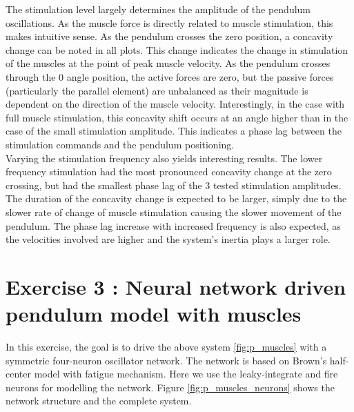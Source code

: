 \documentclass{cmc}
\begin{document}
The stimulation level largely determines the amplitude of the pendulum oscillations. As the muscle force is directly related to muscle stimulation, this makes intuitive sense. As the pendulum crosses the zero position, a concavity change can be noted in all plots. This change indicates the change in stimulation of the muscles at the point of peak muscle velocity. As the pendulum crosses through the 0 angle position, the active forces are zero, but the passive forces (particularly the parallel element) are unbalanced as their magnitude is dependent on the direction of the muscle velocity. Interestingly, in the case with full muscle stimulation, this concavity shift occurs at an angle higher than in the case of the small stimulation amplitude. This indicates a phase lag between the stimulation commands and the pendulum positioning.\\

Varying the stimulation frequency also yields interesting results. The lower frequency stimulation had the most pronounced concavity change at the zero crossing, but had the smallest phase lag of the 3 tested stimulation amplitudes. The duration of the concavity change is expected to be larger, simply due to the slower rate of change of muscle stimulation causing the slower movement of the pendulum. The phase lag increase with increased frequency is also expected, as the velocities involved are higher and the system's inertia plays a larger role. 

\newpage
\section*{Exercise 3 : Neural network driven pendulum model with
  muscles}
\label{sec:neur-netw-driv}

In this exercise, the goal is to drive the above system
\ref{fig:p_muscles} with a symmetric four-neuron oscillator
network. The network is based on Brown's half-center model with
fatigue mechanism. Here we use the leaky-integrate and fire neurons
for modelling the network. Figure \ref{fig:p_muscles_neurons} shows
the network structure and the complete system.
\end{document}
